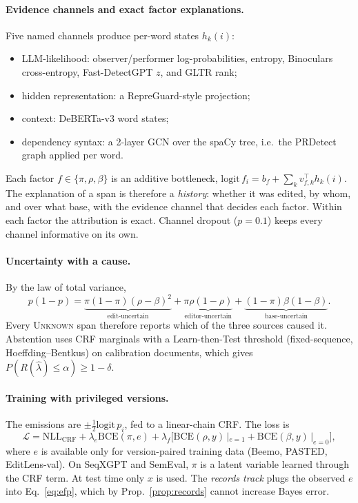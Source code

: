 \documentclass[10pt]{article}
\newcommand{\Unk}{\textsc{Unknown}}
\begin{document}
\paragraph{Evidence channels and exact factor explanations.} Five named channels produce per-word states $h_k(i)$:
\begin{itemize}
\item LLM-likelihood: observer/performer log-probabilities, entropy, Binoculars cross-entropy, Fast-DetectGPT $z$, and GLTR rank;
\item hidden representation: a RepreGuard-style projection;
\item context: DeBERTa-v3 word states;
\item dependency syntax: a 2-layer GCN over the spaCy tree, i.e.\ the PRDetect graph applied per word.
\end{itemize}
Each factor $f\in\{\pi,\rho,\beta\}$ is an additive bottleneck, $\mathrm{logit}\,f_i=b_f+\sum_k v_{f,k}^\top h_k(i)$. The explanation of a span is therefore a \emph{history}: whether it was edited, by whom, and over what base, with the evidence channel that decides each factor. Within each factor the attribution is exact. Channel dropout ($p=0.1$) keeps every channel informative on its own.

\paragraph{Uncertainty with a cause.} By the law of total variance,
\[p(1-p)=\underbrace{\pi(1-\pi)(\rho-\beta)^2}_{\text{edit-uncertain}}+\underbrace{\pi\rho(1-\rho)}_{\text{editor-uncertain}}+\underbrace{(1-\pi)\beta(1-\beta)}_{\text{base-uncertain}}.\]
Every \Unk{} span therefore reports which of the three sources caused it. Abstention uses CRF marginals with a Learn-then-Test threshold (fixed-sequence, Hoeffding--Bentkus) on calibration documents, which gives $P(R(\hat\lambda)\le\alpha)\ge1-\delta$.

\paragraph{Training with privileged versions.} The emissions are $\pm\frac12\mathrm{logit}\,p_i$, fed to a linear-chain CRF. The loss is
\[\mathcal{L}=\mathrm{NLL}_{\mathrm{CRF}}+\lambda_e\mathrm{BCE}(\pi,e)+\lambda_f\big[\mathrm{BCE}(\rho,y)\,|_{e=1}+\mathrm{BCE}(\beta,y)\,|_{e=0}\big],\]
where $e$ is available only for version-paired training data (Beemo, PASTED, EditLens-val). On SeqXGPT and SemEval, $\pi$ is a latent variable learned through the CRF term. At test time only $x$ is used. The \emph{records track} plugs the observed $e$ into Eq.~\eqref{eq:efp}, which by Prop.~\ref{prop:records} cannot increase Bayes error.
\end{document}
